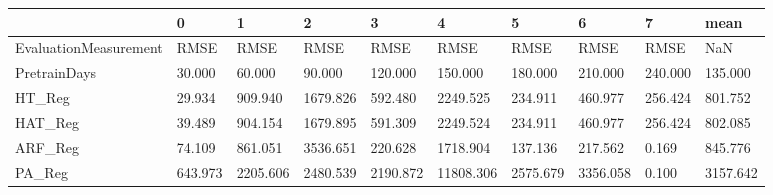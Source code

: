 \begin{tabular}{llllllllll}
\toprule
{} &       0 &        1 &        2 &        3 &         4 &        5 &        6 &       7 &     mean \\
\midrule
EvaluationMeasurement &    RMSE &     RMSE &     RMSE &     RMSE &      RMSE &     RMSE &     RMSE &    RMSE &      NaN \\
PretrainDays          &  30.000 &   60.000 &   90.000 &  120.000 &   150.000 &  180.000 &  210.000 & 240.000 &  135.000 \\
HT\_Reg                &  29.934 &  909.940 & 1679.826 &  592.480 &  2249.525 &  234.911 &  460.977 & 256.424 &  801.752 \\
HAT\_Reg               &  39.489 &  904.154 & 1679.895 &  591.309 &  2249.524 &  234.911 &  460.977 & 256.424 &  802.085 \\
ARF\_Reg               &  74.109 &  861.051 & 3536.651 &  220.628 &  1718.904 &  137.136 &  217.562 &   0.169 &  845.776 \\
PA\_Reg                & 643.973 & 2205.606 & 2480.539 & 2190.872 & 11808.306 & 2575.679 & 3356.058 &   0.100 & 3157.642 \\
\bottomrule
\end{tabular}
